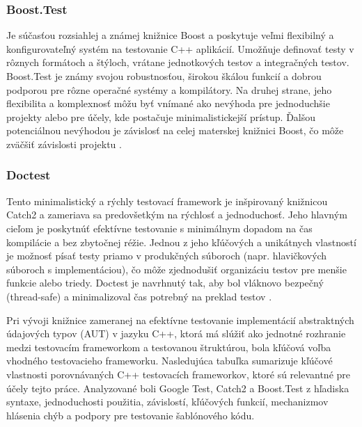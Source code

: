 \documentclass[11pt]{article}
\begin{document}
\subsubsection{Boost.Test}
Je súčasťou rozsiahlej a známej knižnice Boost a poskytuje veľmi flexibilný a konfigurovateľný systém na testovanie C++ aplikácií. Umožňuje definovať testy v rôznych formátoch a štýloch, vrátane jednotkových testov a integračných testov. Boost.Test je známy svojou robustnosťou, širokou škálou funkcií a dobrou podporou pre rôzne operačné systémy a kompilátory. Na druhej strane, jeho flexibilita a komplexnosť môžu byť vnímané ako nevýhoda pre jednoduchšie projekty alebo pre účely, kde postačuje minimalistickejší prístup. Ďalšou potenciálnou nevýhodou je závislosť na celej materskej knižnici Boost, čo môže zväčšiť závislosti projektu \cite{boost_test}.

\subsubsection{Doctest}
Tento minimalistický a rýchly testovací framework je inšpirovaný knižnicou Catch2 a zameriava sa predovšetkým na rýchlosť a jednoduchosť. Jeho hlavným cieľom je poskytnúť efektívne testovanie s minimálnym dopadom na čas kompilácie a bez zbytočnej réžie. Jednou z jeho kľúčových a unikátnych vlastností je možnosť písať testy priamo v produkčných súboroch (napr. hlavičkových súboroch s implementáciou), čo môže zjednodušiť organizáciu testov pre menšie funkcie alebo triedy. Doctest je navrhnutý tak, aby bol vláknovo bezpečný (thread-safe) a minimalizoval čas potrebný na preklad testov \cite{github_doctest}.

Pri vývoji knižnice zameranej na efektívne testovanie implementácií abstraktných údajových typov (AUT) v jazyku C++, ktorá má slúžiť ako jednotné rozhranie medzi testovacím frameworkom a testovanou štruktúrou, bola kľúčová voľba vhodného testovacieho frameworku. Nasledujúca tabuľka sumarizuje kľúčové vlastnosti porovnávaných C++ testovacích frameworkov, ktoré sú relevantné pre účely tejto práce. Analyzované boli Google Test, Catch2 a Boost.Test z hľadiska syntaxe, jednoduchosti použitia, závislostí, kľúčových funkcií, mechanizmov hlásenia chýb a podpory pre testovanie šablónového kódu.
\end{document}
